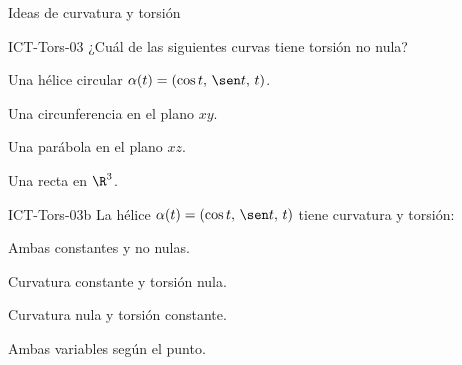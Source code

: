 \documentclass[a4,11pt]{aleph-notas}
\begin{document}
\begin{quiz}{Ideas de curvatura y torsión}
\begin{multi}[]%
    {ICT-Tors-03}
    ¿Cuál de las siguientes curvas tiene torsión no nula?
    \item* Una hélice circular $\alpha(t)=(\cos t,\, \sen t,\, t)$.
    \item Una circunferencia en el plano $xy$.
    \item Una parábola en el plano $xz$.
    \item Una recta en $\R^3$.
\end{multi}

\begin{multi}[]%
    {ICT-Tors-03b}
    La hélice $\alpha(t)=(\cos t,\, \sen t,\, t)$ tiene curvatura y torsión:
    \item* Ambas constantes y no nulas.
    \item Curvatura constante y torsión nula.
    \item Curvatura nula y torsión constante.
    \item Ambas variables según el punto.
\end{multi}

\end{quiz}
\end{document}
